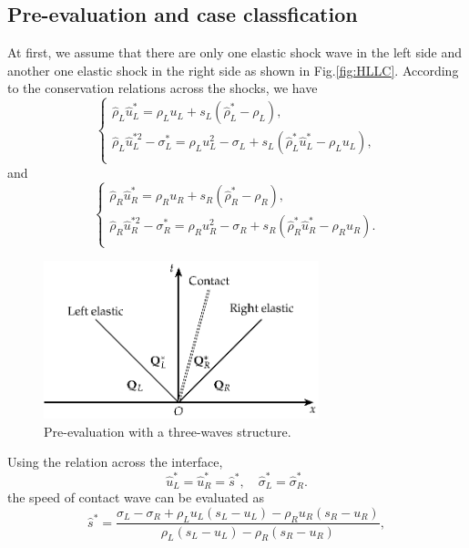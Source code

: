 \documentclass[review]{elsarticle}
\begin{document}
\subsection{Pre-evaluation and case classfication}\label{sec:eva}
At first, we assume that there are only one elastic shock wave in the left side and another one  elastic shock in the right side as shown in Fig.\ref{fig:HLLC}. According to the conservation relations across the shocks, we have    
\begin{equation}
  \left\{
  \begin{align}
	\hat{\rho}_L\hat{u}^*_L = \rho_L u_L +s_L(\hat{\rho}_L^*-\rho_L), \\
	\hat{\rho}_L\hat{u}_L^{*2}-\sigma_L^* = \rho_L u_L^2 -\sigma_L +s_L(\hat{\rho}_L^* \hat{u}_L^*-\rho_L u_L), \\
  \end{align}
\right.
\end{equation}
and
\begin{equation}
  \left\{
  \begin{align}
	\hat{\rho}_R\hat{u}^*_R = \rho_R u_R +s_R(\hat{\rho}_R^*-\rho_R), \\
	\hat{\rho}_R\hat{u}_R^{*2}-\sigma_R^* = \rho_R u_R^2 -\sigma_R +s_R(\hat{\rho}_R^* \hat{u}_R^*-\rho_R u_R). \\
  \end{align}
\right.
\end{equation}
\begin{figure}
  \centering
  \includegraphics[width=8cm]{Tikz-figure7.eps}
  \caption{Pre-evaluation with a three-waves structure.}
\end{figure}
Using the relation across the interface,
\begin{equation}
  \hat{u}_L^* = \hat{u}_R^* =\hat{s}^*,\quad \hat{\sigma}_L^* = \hat{\sigma}_R^*.
\end{equation}
the speed of contact wave can be evaluated as 
\begin{equation}
\hat{s}^* = \frac{\sigma_L-\sigma_R+\rho_L u_L(s_L-u_L)-\rho_R u_R(s_R-u_R)}{\rho_L(s_L-u_L)-\rho_R(s_R-u_R)},
\end{equation}
\end{document}
